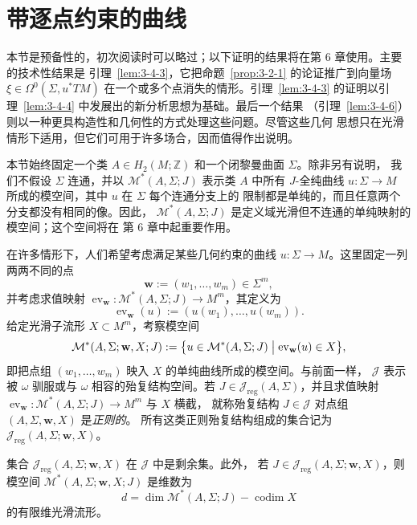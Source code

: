 
\section{带逐点约束的曲线}\label{sec:3-4}

本节是预备性的，初次阅读时可以略过；以下证明的结果将在第 6 章使用。主要的技术性结果是
引理~\ref{lem:3-4-3}，它把命题~\ref{prop:3-2-1} 的论证推广到向量场
$\xi\in\Omega^0(\Sigma,u^*TM)$ 在一个或多个点消失的情形。引理~\ref{lem:3-4-3}
的证明以引理~\ref{lem:3-4-4} 中发展出的新分析思想为基础。最后一个结果
（引理~\ref{lem:3-4-6}）则以一种更具构造性和几何性的方式处理这些问题。尽管这些几何
思想只在光滑情形下适用，但它们可用于许多场合，因而值得作出说明。

本节始终固定一个类 $A\in H_2(M;\mathbb Z)$ 和一个闭黎曼曲面 $\Sigma$。除非另有说明，
我们不假设 $\Sigma$ 连通，并以 $\mathcal M^*(A,\Sigma;J)$ 表示类 $A$ 中所有
$J$-全纯曲线 $u:\Sigma\to M$ 所成的模空间，其中 $u$ 在 $\Sigma$ 每个连通分支上的
限制都是单纯的，而且任意两个分支都没有相同的像。因此，
$\mathcal M^*(A,\Sigma;J)$ 是定义域光滑但不连通的单纯映射的模空间；这个空间将在
第 6 章中起重要作用。

在许多情形下，人们希望考虑满足某些几何约束的曲线 $u:\Sigma\to M$。这里固定一列
两两不同的点
\[
  \mathbf w:=(w_1,\ldots,w_m)\in\Sigma^m,
\]
并考虑求值映射 $\operatorname{ev}_{\mathbf w}:\mathcal M^*(A,\Sigma;J)\to M^m$，其定义为
\[
  \operatorname{ev}_{\mathbf w}(u):=(u(w_1),\ldots,u(w_m)).
\]
给定光滑子流形 $X\subset M^m$，考察模空间
\[
  \mathcal M^*(A,\Sigma;\mathbf w,X;J)
  :=\bigl\{u\in\mathcal M^*(A,\Sigma;J)
  \bigm|\operatorname{ev}_{\mathbf w}(u)\in X\bigr\},
\]
即把点组 $(w_1,\ldots,w_m)$ 映入 $X$ 的单纯曲线所成的模空间。与前面一样，
$\mathcal J$ 表示被 $\omega$ 驯服或与 $\omega$ 相容的殆复结构空间。若
$J\in\mathcal J_{\mathrm{reg}}(A,\Sigma)$，并且求值映射
$\operatorname{ev}_{\mathbf w}:\mathcal M^*(A,\Sigma;J)\to M^m$ 与 $X$ 横截，
就称殆复结构 $J\in\mathcal J$ 对点组 $(A,\Sigma,\mathbf w,X)$ 是\emph{正则的}。
所有这类正则殆复结构组成的集合记为
$\mathcal J_{\mathrm{reg}}(A,\Sigma;\mathbf w,X)$。

\begin{theorem}\label{thm:3-4-1}
集合 $\mathcal J_{\mathrm{reg}}(A,\Sigma;\mathbf w,X)$ 在 $\mathcal J$ 中是剩余集。此外，
若 $J\in\mathcal J_{\mathrm{reg}}(A,\Sigma;\mathbf w,X)$，则模空间
$\mathcal M^*(A,\Sigma;\mathbf w,X;J)$ 是维数为
\[
  d=\dim\mathcal M^*(A,\Sigma;J)-\operatorname{codim}X
\]
的有限维光滑流形。
\end{theorem}

